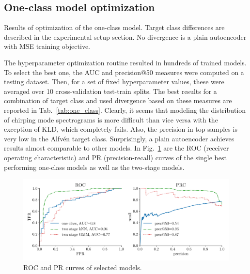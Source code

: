 \subsection{One-class model optimization}

\begin{table}
  \centering
  
  \caption{Results of optimization of the one-class model. Target class differences are described in the experimental setup section. No divergence is a plain autoencoder with MSE training objective.}
  \label{tab:one_class}
\end{table}

The hyperparameter optimization routine resulted in hundreds of trained models. To select the best one, the AUC and precision@50 measures were computed on a testing dataset. Then, for a set of fixed hyperparameter values, these were averaged over 10 cross-validation test-train splits. The best results for a combination of target class and used divergence based on these measures are reported in Tab.~\ref{tab:one_class}. Clearly, it seems that modeling the distribution of chirping mode spectrograms is more difficult than vice versa with the exception of KLD, which completely fails. Also, the precision in top samples is very low in the Alfv\'en target class. Surprisingly, a plain autoencoder achieves results almost comparable to other models. In Fig.~\ref{fig:roc_prc} are the ROC (receiver operating characteristic)\cite{fawcett2006introduction} and PR (precision-recall)\cite{boyd2013area} curves of the single best performing one-class models as well as the two-stage models.

\begin{figure}
\begin{centering}
\includegraphics[scale=0.6]{data/chapter_alfven/roc_prc.pdf}
\end{centering}
\caption{ROC and PR curves of selected models.}
\label{fig:roc_prc}
\end{figure}

